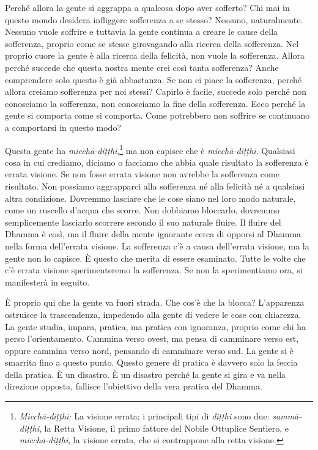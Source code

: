 Perché allora la gente si aggrappa a qualcosa dopo aver sofferto? Chi
mai in questo mondo desidera infliggere sofferenza a se stesso? Nessuno,
naturalmente. Nessuno vuole soffrire e tuttavia la gente continua a
creare le cause della sofferenza, proprio come se stesse girovagando
alla ricerca della sofferenza. Nel proprio cuore la gente è alla ricerca
della felicità, non vuole la sofferenza. Allora perché succede che
questa nostra mente crei così tanta sofferenza? Anche comprendere solo
questo è già abbastanza. Se non ci piace la sofferenza, perché allora
creiamo sofferenza per noi stessi? Capirlo è facile, succede solo perché
non conosciamo la sofferenza, non conosciamo la fine della sofferenza.
Ecco perché la gente si comporta come si comporta. Come potrebbero non
soffrire se continuano a comportarsi in questo modo?

Questa gente ha \emph{micchā-diṭṭhi},\footnote{\emph{Micchā-diṭṭhi:} La
  visione errata; i principali tipi di \emph{diṭṭhi} sono due:
  \emph{sammā-diṭṭhi}, la Retta Visione, il primo fattore del Nobile
  Ottuplice Sentiero, e \emph{micchā-diṭṭhi}, la visione errata, che si
  contrappone alla retta visione.} ma non capisce che è
\emph{micchā-diṭṭhi}. Qualsiasi cosa in cui crediamo, diciamo o facciamo
che abbia quale risultato la sofferenza è errata visione. Se non fosse
errata visione non avrebbe la sofferenza come risultato. Non possiamo
aggrapparci alla sofferenza né alla felicità né a qualsiasi altra
condizione. Dovremmo lasciare che le cose siano nel loro modo naturale,
come un ruscello d'acqua che scorre. Non dobbiamo bloccarlo, dovremmo
semplicemente lasciarlo scorrere secondo il suo naturale fluire. Il
fluire del Dhamma è così, ma il fluire della mente ignorante cerca di
opporsi al Dhamma nella forma dell'errata visione. La sofferenza c'è a
causa dell'errata visione, ma la gente non lo capisce. È questo che
merita di essere esaminato. Tutte le volte che c'è errata visione
sperimenteremo la sofferenza. Se non la sperimentiamo ora, si
manifesterà in seguito.

È proprio qui che la gente va fuori strada. Che cos'è che la blocca?
L'apparenza ostruisce la trascendenza, impedendo alla gente di vedere le
cose con chiarezza. La gente studia, impara, pratica, ma pratica con
ignoranza, proprio come chi ha perso l'orientamento. Cammina verso
ovest, ma pensa di camminare verso est, oppure cammina verso nord,
pensando di camminare verso sud. La gente si è smarrita fino a questo
punto. Questo genere di pratica è davvero solo la feccia della pratica.
È un disastro. È un disastro perché la gente si gira e va nella
direzione opposta, fallisce l'obiettivo della vera pratica del Dhamma.

